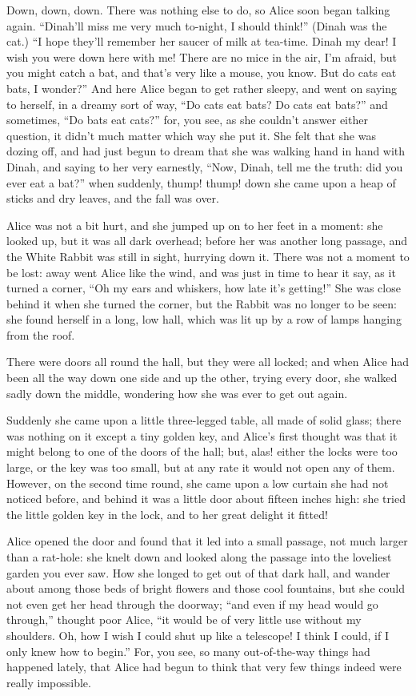\documentclass[book, 20pt]{extbook}
\begin{document}
Down, down, down. There was nothing else to do, so Alice soon began
talking again. ``Dinah'll miss me very much to-night, I should think!''
(Dinah was the cat.) ``I hope they'll remember her saucer of milk at
tea-time. Dinah my dear! I wish you were down here with me! There are no
mice in the air, I'm afraid, but you might catch a bat, and that's very
like a mouse, you know. But do cats eat bats, I wonder?'' And here Alice
began to get rather sleepy, and went on saying to herself, in a dreamy
sort of way, ``Do cats eat bats? Do cats eat bats?'' and sometimes, ``Do
bats eat cats?'' for, you see, as she couldn't answer either question,
it didn't much matter which way she put it. She felt that she was dozing
off, and had just begun to dream that she was walking hand in hand with
Dinah, and saying to her very earnestly, ``Now, Dinah, tell me the
truth: did you ever eat a bat?'' when suddenly, thump! thump! down she
came upon a heap of sticks and dry leaves, and the fall was over.

Alice was not a bit hurt, and she jumped up on to her feet in a moment:
she looked up, but it was all dark overhead; before her was another long
passage, and the White Rabbit was still in sight, hurrying down it.
There was not a moment to be lost: away went Alice like the wind, and
was just in time to hear it say, as it turned a corner, ``Oh my ears and
whiskers, how late it's getting!'' She was close behind it when she
turned the corner, but the Rabbit was no longer to be seen: she found
herself in a long, low hall, which was lit up by a row of lamps hanging
from the roof.

There were doors all round the hall, but they were all locked; and when
Alice had been all the way down one side and up the other, trying every
door, she walked sadly down the middle, wondering how she was ever to
get out again.

Suddenly she came upon a little three-legged table, all made of solid
glass; there was nothing on it except a tiny golden key, and Alice's
first thought was that it might belong to one of the doors of the hall;
but, alas! either the locks were too large, or the key was too small,
but at any rate it would not open any of them. However, on the second
time round, she came upon a low curtain she had not noticed before, and
behind it was a little door about fifteen inches high: she tried the
little golden key in the lock, and to her great delight it fitted!

Alice opened the door and found that it led into a small passage, not
much larger than a rat-hole: she knelt down and looked along the passage
into the loveliest garden you ever saw. How she longed to get out of
that dark hall, and wander about among those beds of bright flowers and
those cool fountains, but she could not even get her head through the
doorway; ``and even if my head would go through,'' thought poor Alice,
``it would be of very little use without my shoulders. Oh, how I wish I
could shut up like a telescope! I think I could, if I only knew how to
begin.'' For, you see, so many out-of-the-way things had happened
lately, that Alice had begun to think that very few things indeed were
really impossible.
\end{document}
